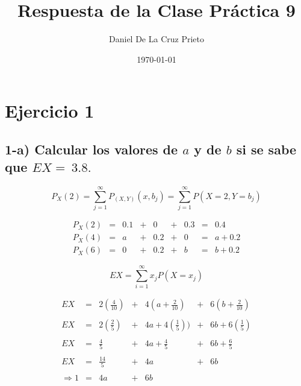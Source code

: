 \documentclass[12pt]{article}
\begin{document}
\title{Respuesta de la Clase Pr\'actica 9}
\author{Daniel De La Cruz Prieto}
\date{\today}

\maketitle


\section*{Ejercicio 1}

\subsection*{1-a) Calcular los valores de $a$ y de $b$ si se sabe que $EX =~ 3.8.$}

\begin{equation*}
    P_X\left(2\right) = \sum_{j=1}^{\infty}	P_{\left(X,Y\right)} \left(x,b_j\right) = \sum_{j=1}^{\infty} P\left(X=2,Y=b_j\right)
\end{equation*}

\begin{equation*}
    \begin{array}{rcccccccl}
        P_X\left(2\right) & = & 0.1 & + & 0   & + & 0.3 & = & 0.4
        \\
        P_X\left(4\right) & = & a   & + & 0.2 & + & 0   & = & a + 0.2
        \\
        P_X\left(6\right) & = & 0   & + & 0.2 & + & b   & = & b + 0.2
    \end{array}
\end{equation*}

\begin{equation*}
    EX = \sum_{i=1}^{\infty} x_j P\left(X=x_j\right)
\end{equation*}

\begin{equation*}
    \begin{array}{rcccccl}
        EX            & = & 2(\frac{4}{10})          & + & 4(a+\frac{2}{10})             & + & 6(b+\frac{2}{10})
        \\
        \\
        EX            & = & 2 \left(\frac{2}{5}\right)  & + & 4a + 4 \left(\frac{1}{5}\right))  & + & 6b + 6 \left(\frac{1}{5}\right) 
        \\
        \\
        EX            & = & \frac{4}{5}     & + & 4a + \frac{4}{5}     & + & 6b + \frac{6}{5}
        \\
        \\
        EX            & = & \frac{14}{5}    & + & 4a                   & + & 6b
        \\
        \\
        \Rightarrow 1 & = & 4a              & + & 6b
    \end{array}
\end{equation*}
\end{document}
